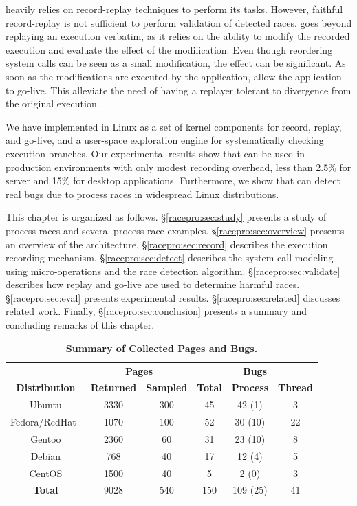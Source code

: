 \racepro heavily relies on record-replay techniques to perform its tasks.
However, faithful record-replay is not sufficient to perform validation of
detected races. \racepro goes beyond replaying an execution verbatim,
as it relies on the ability to modify the recorded execution and evaluate the
effect of the modification. Even though reordering system calls can be seen as a
small modification, the effect can be significant. As soon as the modifications
are executed by the application, \racepro allow the application to go-live.
This alleviate the need of having a replayer tolerant to divergence from
the original execution.

We have implemented \racepro in Linux as a set of kernel components for
record, replay, and go-live, and a user-space exploration engine for
systematically checking execution branches.  Our experimental results
show that \racepro can be used in production environments with only
modest recording overhead, less than 2.5\% for server and 15\% for
desktop applications.  Furthermore, we show that \racepro can detect
\nracepro real bugs due to process races in widespread Linux
distributions. 

This chapter is organized as follows.  \S\ref{racepro:sec:study} presents a
study of process races and several process race examples.
\S\ref{racepro:sec:overview} presents an overview of the \racepro architecture.
\S\ref{racepro:sec:record} describes the execution recording mechanism.
\S\ref{racepro:sec:detect} describes  the system call modeling using
micro-operations and the race detection algorithm.
\S\ref{racepro:sec:validate} describes how replay and go-live are used to
determine harmful races.  \S\ref{racepro:sec:eval} presents experimental
results. \S\ref{racepro:sec:related} discusses related work.
Finally, \S\ref{racepro:sec:conclusion} presents a summary and concluding remarks of this chapter.

\begin{table}[t]
\centering
\begin{tabular}{c|cc|ccc}
  \toprule
                                    & \multicolumn{2}{c|}{\bf Pages} & \multicolumn{3}{c}{\bf Bugs} \\
  {\bf Distribution} & {\bf Returned} & {\bf Sampled} & {\bf Total} & {\bf Process} & {\bf Thread} \\ \midrule
  Ubuntu              & 3330 & 300  & 45  & 42 (1)   & 3   \\
  Fedora/RedHat\,\,\, & 1070 & 100  & 52  & 30 (10)  & 22  \\
  Gentoo              & 2360 & 60   & 31  & 23 (10)  & 8   \\
  Debian              & 768  & 40   & 17  & 12 (4)   & 5   \\
  CentOS              & 1500 & 40   & 5   & 2 (0)    & 3   \\
  \midrule
  {\bf Total}         & 9028 & 540  & 150 & 109 (25) & 41  \\
  \bottomrule
\end{tabular}
\caption{{\bf Summary of Collected Pages and Bugs.}}
\label{racepro:tab:data}
\end{table}


